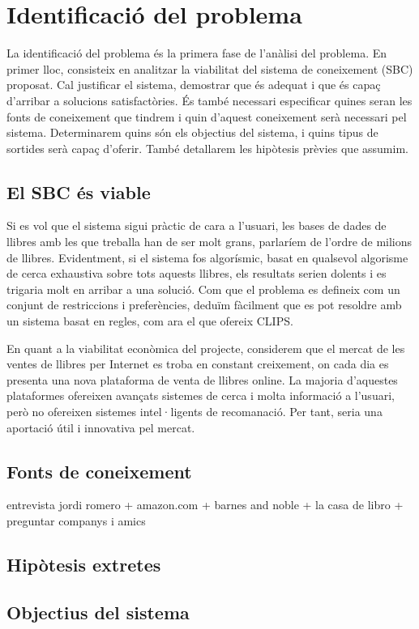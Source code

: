 
\section{Identificació del problema}

La identificació del problema és la primera fase de l'anàlisi del problema. En primer lloc, consisteix en analitzar la viabilitat del sistema de coneixement (SBC) proposat. Cal justificar el sistema, demostrar que és adequat i que és capaç d'arribar a solucions satisfactòries. És també necessari especificar quines seran les fonts de coneixement que tindrem i quin d'aquest coneixement serà necessari pel sistema. Determinarem quins són els objectius del sistema, i quins tipus de sortides serà capaç d'oferir. També detallarem les hipòtesis prèvies que assumim.

\subsection{El SBC és viable}

Si es vol que el sistema sigui pràctic de cara a l'usuari, les bases de dades de llibres amb les que treballa han de ser molt grans, parlaríem de l'ordre de milions de llibres. Evidentment, si el sistema fos algorísmic, basat en qualsevol algorisme de cerca exhaustiva sobre tots aquests llibres, els resultats serien dolents i es trigaria molt en arribar a una solució. Com que el problema es defineix com un conjunt de restriccions i preferències, deduïm fàcilment que es pot resoldre amb un sistema basat en regles, com ara el que ofereix CLIPS.

En quant a la viabilitat econòmica del projecte, considerem que el mercat de les ventes de llibres per Internet es troba en constant creixement, on cada dia es presenta una nova plataforma de venta de llibres online. La majoria d'aquestes plataformes ofereixen avançats sistemes de cerca i molta informació a l'usuari, però no ofereixen sistemes intel·ligents de recomanació. Per tant, seria una aportació útil i innovativa pel mercat.

\subsection{Fonts de coneixement}

entrevista jordi romero + amazon.com + barnes and noble + la casa de libro + preguntar companys i amics

\subsection{Hipòtesis extretes}

\subsection{Objectius del sistema}



